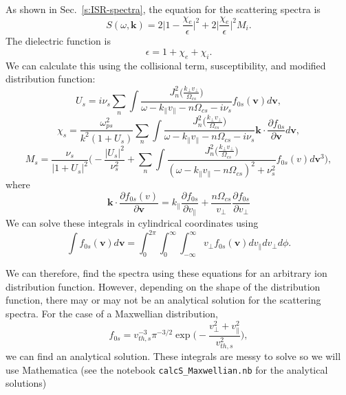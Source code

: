 As shown in Sec.~\ref{s:ISR-spectra}, the equation for the scattering spectra is
\begin{equation}
	S(\omega,\mathbf{k}) = 2 \Big| 1 - \frac{\chi_e}{\epsilon}\Big|^2
	+ 2\Big|\frac{\chi_e}{\epsilon}\Big|^2 M_i.
\end{equation}
The dielectric function is
\begin{equation}
	\epsilon = 1 + \chi_e + \chi_i.
\end{equation}
We can calculate this using the collisional term, susceptibility, and modified distribution function:
\begin{equation}
	U_s = i\nu_s \sum_n \int
	\frac{J_n^2\Big( \tfrac{k_\perp v_\perp}{\Omega_{cs}} \Big)}
	{\omega-k_\parallel v_\parallel - n\Omega_{cs} - i\nu_s}
	f_{0s}(\mathbf{v}) d\mathbf{v} ,
\end{equation}
\begin{equation}
	\chi_s = \frac{\omega_{ps}^2}{k^2(1+U_s)}
	\sum_n \int
	\frac{J_n^2 \Big( \tfrac{k_\perp v_\perp}{\Omega_{cs}} \Big)}
	{\omega-k_\parallel v_\parallel - n\Omega_{cs} - i\nu_s}
	\mathbf{k} \cdot \frac{\partial f_{0s}}{\partial \mathbf{v}} d\mathbf{v},
\end{equation}
\begin{equation}
	M_s = \frac{\nu_s}{|1+U_s|^2}
	\Bigg( - \frac{|U_s|^2}{\nu_s^2} 
	+ \sum_n \int 
	\frac{J_n^2\Big( \tfrac{k_\perp v_\perp}{\Omega_{cs}} \Big)}
	{(\omega - k_\parallel v_\parallel - n\Omega_{cs})^2 + \nu_s^2}
	f_{0s}(v)   d\mathbf{v}^3 \Bigg),
\end{equation}
where 
\begin{equation}
	\mathbf{k} \cdot \frac{\partial f_{0s}(v) }{\partial \mathbf{v}} = 
		k_\parallel \frac{\partial f_{0s}}{\partial v_\parallel}
		+ \frac{n \Omega_{cs}}{v_\perp} \frac{\partial f_{0s}}{\partial v_\perp}
\end{equation}
We can solve these integrals in cylindrical coordinates using 
\begin{equation}
	\int f_{0s}(\mathbf{v}) d\mathbf{v} = \int_0^{2\pi} \int_0^\infty \int_{-\infty}^\infty v_\perp f_{0s}(\mathbf{v}) 
	dv_\parallel dv_\perp d\phi.
\end{equation}

We can therefore, find the spectra using these equations
for an arbitrary ion distribution function.
However, depending on the shape of the distribution function, there may or may not be an
analytical solution for the scattering spectra.
For the case of a Maxwellian distribution, 
\begin{equation}
	f_{0s} = v_{th,s}^{-3}\pi^{-3/2} 
	\exp\bigg( - \frac{v_\perp^2+v_\parallel^2}{v_{th,s}^2} \bigg),
\end{equation}
we can find an analytical solution.
These integrals are messy to solve so we will use Mathematica (see the notebook \verb|calcS_Maxwellian.nb| for the analytical solutions)  %

